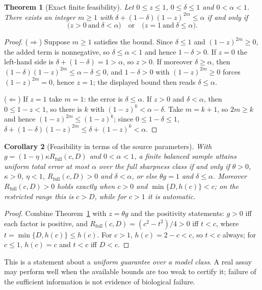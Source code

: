 \documentclass[11pt]{article}
\newtheorem{theorem}{Theorem}[section]
\newtheorem{corollary}[theorem]{Corollary}
\theoremstyle{definition}
\theoremstyle{remark}
\newcommand{\Rfull}{R_{\mathrm{full}}}
\newcommand{\hc}{h(c)}
\begin{document}
\begin{theorem}[Exact finite feasibility]\label{thm:feasible}
Let $0\le z\le1$, $0\le\delta\le1$ and $0<\alpha<1$. There exists an integer
$m\ge1$ with $\delta+(1-\delta)(1-z)^{2m}\le\alpha$ if and only if
\[
\bigl(z>0\ \text{and}\ \delta<\alpha\bigr)\quad\text{or}\quad
\bigl(z=1\ \text{and}\ \delta\le\alpha\bigr).
\]
\end{theorem}

\begin{proof}
($\Rightarrow$) Suppose $m\ge1$ satisfies the bound. Since $\delta\le1$ and
$(1-z)^{2m}\ge0$, the added term is nonnegative, so $\delta\le\alpha<1$ and
hence $1-\delta>0$. If $z=0$ the left-hand side is $\delta+(1-\delta)=1>\alpha$,
so $z>0$. If moreover $\delta\ge\alpha$, then
$(1-\delta)(1-z)^{2m}\le\alpha-\delta\le0$, and $1-\delta>0$ with
$(1-z)^{2m}\ge0$ forces $(1-z)^{2m}=0$, hence $z=1$; the displayed bound then
reads $\delta\le\alpha$.

($\Leftarrow$) If $z=1$ take $m=1$: the error is $\delta\le\alpha$. If $z>0$ and
$\delta<\alpha$, then $0\le1-z<1$, so there is $k$ with
$(1-z)^k<\alpha-\delta$. Take $m=k+1$, so $2m\ge k$ and hence
$(1-z)^{2m}\le(1-z)^k$; since $0\le1-\delta\le1$,
$\delta+(1-\delta)(1-z)^{2m}\le\delta+(1-z)^k<\alpha$.
\end{proof}

\begin{corollary}[Feasibility in terms of the source parameters]\label{cor:feasible}
With $g=(1-\eta)\kappa\Rfull(c,D)$ and $0<\alpha<1$, a finite balanced sample
attains uniform total error at most $\alpha$ over the full sharpness class if and
only if $\theta>0$, $\kappa>0$, $\eta<1$, $\Rfull(c,D)>0$ and $\delta<\alpha$,
or else $\theta g=1$ and $\delta\le\alpha$. Moreover $\Rfull(c,D)>0$ holds
exactly when $c>0$ and $\min\{D,\hc\}<c$; on the restricted range this is
$c>D$, while for $c>1$ it is automatic.
\end{corollary}

\begin{proof}
Combine Theorem~\ref{thm:feasible} with $z=\theta g$ and the positivity
statements: $g>0$ iff each factor is positive, and $\Rfull(c,D)=(c^2-t^2)/4>0$
iff $t<c$, where $t=\min\{D,\hc\}\le \hc$. For $c>1$, $\hc=2-c<c$, so $t<c$
always; for $c\le1$, $\hc=c$ and $t<c$ iff $D<c$.
\end{proof}

This is a statement about a \emph{uniform guarantee over a model class}. A real
assay may perform well when the available bounds are too weak to certify it;
failure of the sufficient information is not evidence of biological failure.
\end{document}

